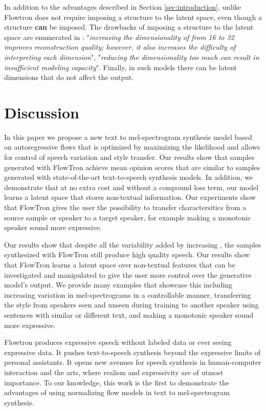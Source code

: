 \documentclass{article}
\begin{document}
In addition to the advantages described in Section \ref{sec:introduction}, unlike \cite{wang2018style,skerry2018towards, hsu2018hierarchical,akuzawa2018expressive} Flowtron does not require imposing a structure to the latent space, even though a structure \textbf{can} be imposed. The drawbacks of imposing a structure to the latent space are enumerated in \cite{wang2018style,skerry2018towards, hsu2018hierarchical}: "\textit{increasing the dimensionality of  from 16 to 32 improves reconstruction quality; however, it also increases the difficulty of interpreting each dimension}", "\textit{reducing the dimensionality too much can result in insufficient modeling capacity}". Finally, in such models there can be latent dimensions that do not affect the output.
\fi  \section{Discussion}\label{sec:discussion}
In this paper we propose a new text to mel-spectrogram synthesis model based on autoregressive flows that is optimized by maximizing the likelihood and allows for control of speech variation and style transfer. Our results show that samples generated with FlowTron achieve mean opinion scores that are similar to samples generated with state-of-the-art text-to-speech synthesis models. In addition, we demonstrate that at no extra cost and without a compound loss term, our model learns a latent space that stores non-textual information. Our experiments show that FlowTron gives the user the possibility to transfer charactersitics from a source sample or speaker to a target speaker, for example making a monotonic speaker sound more expressive. 

Our results show that despite all the variability added by increasing , the samples synthesized with FlowTron still produce high quality speech. Our results show that FlowTron learns a latent space over non-textual features that can be investigated and manipulated to give the user more control over the generative model’s output. We provide many examples that showcase this including increasing variation in mel-spectrograms in a controllable manner, transferring the style from speakers seen and unseen during training to another speaker using sentences with similar or different text, and making a monotonic speaker sound more expressive. 

Flowtron produces expressive speech without labeled data or ever seeing expressive data. It pushes text-to-speech synthesis beyond the expressive limits of personal assistants. It opens new avenues for speech synthesis in human-computer interaction and the arts, where realism and expressivity are of utmost importance. To our knowledge, this work is the first to demonstrate the advantages of using normalizing flow models in text to mel-spectrogram synthesis. 

\newpage



\newpage
\end{document}
